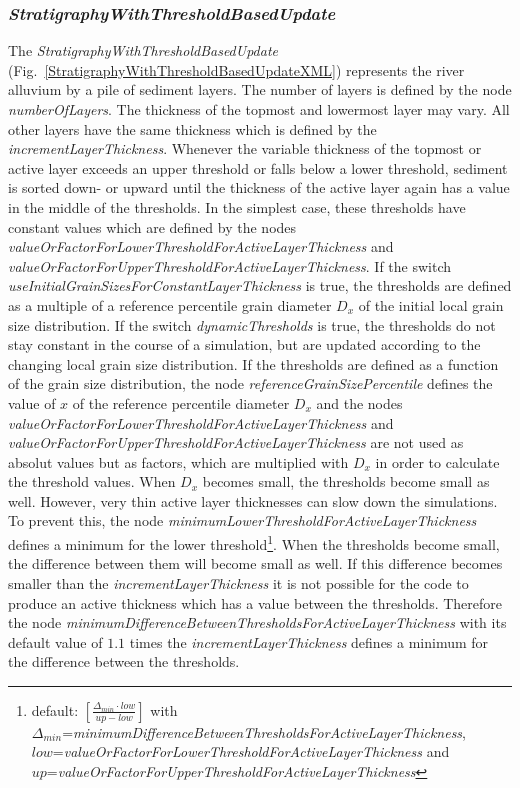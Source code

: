 \documentclass[11pt,a4paper]{article}
\begin{document}
\subsubsection{\emph{StratigraphyWithThresholdBasedUpdate}}\label{StratigraphyWithThresholdBasedUpdate}
The \emph{StratigraphyWithThresholdBasedUpdate} (Fig.~\ref{StratigraphyWithThresholdBasedUpdateXML}) represents the river alluvium by a pile of sediment layers. The number of layers is defined by the node \emph{numberOfLayers}. The thickness of the topmost and lowermost layer may vary. All other layers have the same thickness which is defined by the \emph{incrementLayerThickness}. Whenever the variable thickness of the topmost or active layer exceeds an upper threshold or falls below a lower threshold, sediment is sorted down- or upward until the thickness of the active layer again has a value in the middle of the thresholds. In the simplest case, these thresholds have constant values which are defined by the nodes \emph{valueOrFactorForLowerThresholdForActiveLayerThickness} and \emph{valueOrFactorForUpperThresholdForActiveLayerThickness}. If the switch \emph{useInitialGrainSizesForConstantLayerThickness} is true, the thresholds are defined as a multiple of a reference percentile grain diameter $D_x$ of the initial local grain size distribution. If the switch \emph{dynamicThresholds} is true, the thresholds do not stay constant in the course of a simulation, but are updated according to the changing local grain size distribution. If the thresholds are defined as a function of the grain size distribution, the node \emph{referenceGrainSizePercentile} defines the value of $x$ of the reference percentile diameter $D_x$ and the nodes \emph{valueOrFactorForLowerThresholdForActiveLayerThickness} and \emph{valueOrFactorForUpperThresholdForActiveLayerThickness} are not used as absolut values but as factors, which are multiplied with $D_x$ in order to calculate the threshold values. When $D_x$ becomes small, the thresholds become small as well. However, very thin active layer thicknesses can slow down the simulations. To prevent this, the node \emph{minimumLowerThresholdForActiveLayerThickness} defines a minimum for the lower threshold\footnote{default: $\left[\frac{\Delta_{min} \cdot low}{up - low}\right]$ with\\$\Delta_{min}$=\emph{minimumDifferenceBetweenThresholdsForActiveLayerThickness},\\$low$=\emph{valueOrFactorForLowerThresholdForActiveLayerThickness} and\\$up$=\emph{valueOrFactorForUpperThresholdForActiveLayerThickness}}. When the thresholds become small, the difference between them will become small as well. If this difference becomes smaller than the \emph{incrementLayerThickness} it is not possible for the code to produce an active thickness which has a value between the thresholds. Therefore the node \emph{minimumDifferenceBetweenThresholdsForActiveLayerThickness} with its default value of $1.1$ times the \emph{incrementLayerThickness} defines a minimum for the difference between the thresholds.
\end{document}
